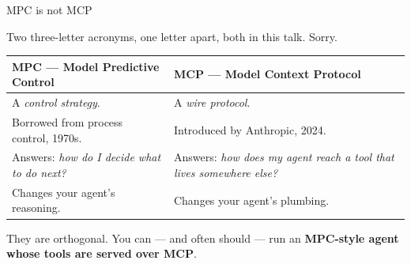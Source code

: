 \documentclass[aspectratio=169,10pt]{beamer}
\newcommand{\hl}[1]{\textcolor{accent}{\textbf{#1}}}
\begin{document}
\begin{frame}{MPC is not MCP}
\begin{center}\large
Two three-letter acronyms, one letter apart, both in this talk. Sorry.
\end{center}

\vspace{1em}
\begin{center}
\begin{tabular}{@{}p{}p{}@{}}
\toprule
\textbf{MPC} --- Model Predictive Control & \textbf{MCP} --- Model Context Protocol \\
\midrule
A \emph{control strategy}. & A \emph{wire protocol}. \\[4pt]
Borrowed from process control, 1970s. & Introduced by Anthropic, 2024. \\[4pt]
Answers: \emph{how do I decide what to do next?} & Answers: \emph{how does my agent reach a tool that lives somewhere else?} \\[4pt]
Changes your agent's reasoning. & Changes your agent's plumbing. \\
\bottomrule
\end{tabular}
\end{center}

\vspace{1em}
\begin{center}
They are orthogonal. You can --- and often should --- run an
\hl{MPC-style agent whose tools are served over MCP}.
\end{center}
\end{frame}
\end{document}
